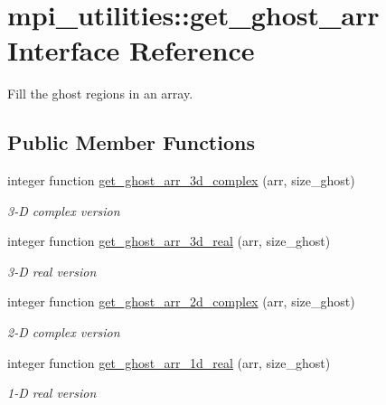\hypertarget{interfacempi__utilities_1_1get__ghost__arr}{}\section{mpi\+\_\+utilities\+:\+:get\+\_\+ghost\+\_\+arr Interface Reference}
\label{interfacempi__utilities_1_1get__ghost__arr}


Fill the ghost regions in an array.  


\subsection*{Public Member Functions}
\begin{DoxyCompactItemize}
\item 
integer function \hyperlink{interfacempi__utilities_1_1get__ghost__arr_acd799ae92cda038e384ea880ba3e1e47}{get\+\_\+ghost\+\_\+arr\+\_\+3d\+\_\+complex} (arr, size\+\_\+ghost)
\begin{DoxyCompactList}\small\item\em 3-\/D complex version \end{DoxyCompactList}\item 
integer function \hyperlink{interfacempi__utilities_1_1get__ghost__arr_a1842d2c9aa474db69bc602a93a2a8fb8}{get\+\_\+ghost\+\_\+arr\+\_\+3d\+\_\+real} (arr, size\+\_\+ghost)
\begin{DoxyCompactList}\small\item\em 3-\/D real version \end{DoxyCompactList}\item 
integer function \hyperlink{interfacempi__utilities_1_1get__ghost__arr_a0f44c60a985e67bdd5fda528b62fe54e}{get\+\_\+ghost\+\_\+arr\+\_\+2d\+\_\+complex} (arr, size\+\_\+ghost)
\begin{DoxyCompactList}\small\item\em 2-\/D complex version \end{DoxyCompactList}\item 
integer function \hyperlink{interfacempi__utilities_1_1get__ghost__arr_ae22d801d2e457c6b91bd1fecab2bfcff}{get\+\_\+ghost\+\_\+arr\+\_\+1d\+\_\+real} (arr, size\+\_\+ghost)
\begin{DoxyCompactList}\small\item\em 1-\/D real version \end{DoxyCompactList}\end{DoxyCompactItemize}


